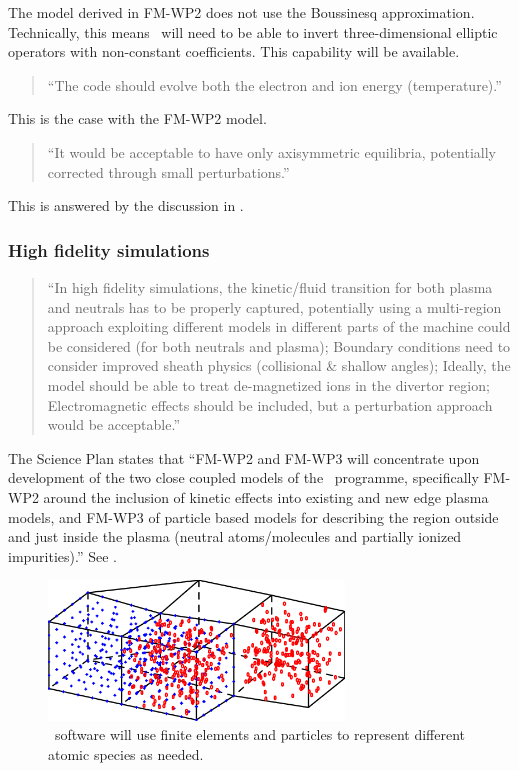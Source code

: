 The model derived in FM-WP2 does not use the Boussinesq approximation.
Technically, this means \nep\ will need to be able to invert three-dimensional
elliptic operators with non-constant coefficients.
This capability will be available.

\begin{quote}
``The code should evolve both the electron and ion energy (temperature).''
\end{quote}
This is the case with the FM-WP2 model.

\begin{quote}
``It would be acceptable to have only axisymmetric equilibria,
potentially corrected through small perturbations.''
\end{quote}
This is answered by the discussion in .


\subsubsection{High fidelity simulations}
\begin{quote}
``In high fidelity simulations, the kinetic/fluid transition for both plasma and
neutrals has to be properly captured, potentially using a multi-region approach
exploiting different models in different parts of the machine could be
considered (for both neutrals and plasma);
Boundary conditions need to consider improved sheath physics (collisional \&
shallow angles);
Ideally, the model should be able to treat de-magnetized ions in the divertor
region;
Electromagnetic effects should be included, but a perturbation approach would
be acceptable.''
\end{quote}

The Science Plan states that {\green ``FM-WP2 and FM-WP3 will concentrate upon
development of the two close coupled models of the \nep \  programme,
specifically FM-WP2 around the inclusion of kinetic effects into existing and
new edge plasma models, and FM-WP3 of particle based models for describing the
region outside and just inside the plasma (neutral atoms/molecules and
partially ionized impurities).''} See .

\begin{figure}
\centerline{\includegraphics[width=0.7\textwidth]{../png/colpri.png}}
\caption{
\nep \ software will use finite elements and particles to represent different atomic species
as needed.
\label{fig:colpri}}
\end{figure}

